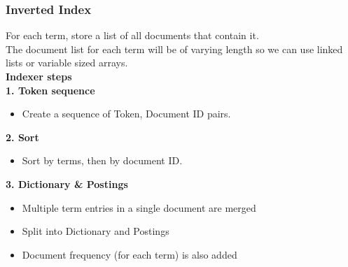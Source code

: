 \documentclass[11pt]{article}
\begin{document}
\subsubsection{Inverted Index}
For each term, store a list of all documents that contain it.\\
The document list for each term will be of varying length so we can use linked lists or variable sized arrays.\\
\newline
\textbf{Indexer steps}\\
\newline
\textbf{1. Token sequence}
\begin{itemize}
    \item Create a sequence of Token, Document ID pairs.
\end{itemize}
\textbf{2. Sort}
\begin{itemize}
    \item Sort by terms, then by document ID.
\end{itemize}
\textbf{3. Dictionary \& Postings}
\begin{itemize}
    \item Multiple term entries in a single document are merged
    \item Split into Dictionary and Postings
    \item Document frequency (for each term) is also added
\end{itemize}
\end{document}
